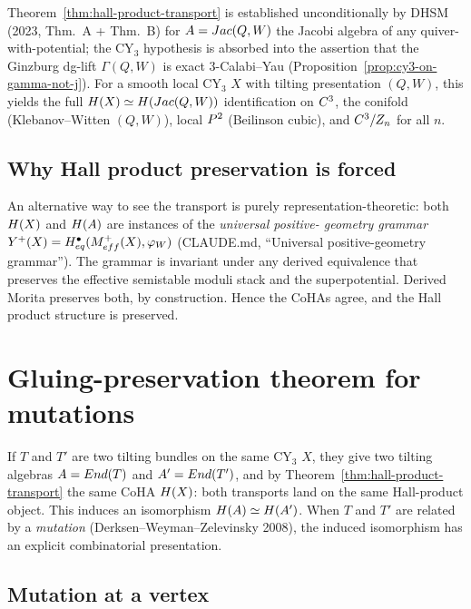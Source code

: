 Theorem~\ref{thm:hall-product-transport} is established unconditionally by
DHSM (2023, Thm.~A + Thm.~B) for $A = Jac(Q, W)$ the Jacobi algebra of any
quiver-with-potential; the CY$_3$ hypothesis is absorbed into the assertion
that the Ginzburg dg-lift $\Gamma(Q, W)$ is exact $3$-Calabi--Yau
(Proposition~\ref{prop:cy3-on-gamma-not-j}). For a smooth local CY$_3$ $X$
with tilting presentation $(Q, W)$, this yields the full
$H(X) \simeq H(Jac(Q, W))$ identification on $C^3$, the conifold
(Klebanov--Witten $(Q, W)$), local $P^2$ (Beilinson cubic), and
$C^3/Z_n$ for all $n$.

\subsection*{Why Hall product preservation is forced}

An alternative way to see the transport is purely representation-theoretic:
both $H(X)$ and $H(A)$ are instances of the \emph{universal positive-
geometry grammar} $Y^+(X) = H^\bullet_{eq}(M^+_{eff}(X),
\varphi_W)$ (CLAUDE.md, ``Universal positive-geometry grammar''). The
grammar is invariant under any derived equivalence that preserves the
effective semistable moduli stack and the superpotential. Derived Morita
preserves both, by construction. Hence the CoHAs agree, and the Hall product
structure is preserved.

\section{Gluing-preservation theorem for mutations}
\label{sec:mutation-preservation}

If $T$ and $T'$ are two tilting bundles on the same CY$_3$ $X$, they give two
tilting algebras $A = End(T)$ and $A' = End(T')$, and by
Theorem~\ref{thm:hall-product-transport} the same CoHA $H(X)$: both
transports land on the same Hall-product object. This induces an isomorphism
$H(A) \simeq H(A')$. When $T$ and $T'$ are related by a \emph{mutation}
(Derksen--Weyman--Zelevinsky 2008), the induced isomorphism has an explicit
combinatorial presentation.

\subsection*{Mutation at a vertex}

